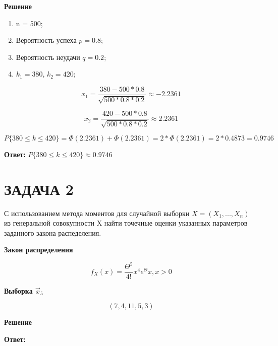 \documentclass[12pt, a4paper]{report}
\begin{document}
	
	\vspace{0.2cm}
	\textbf{Решение}
	
	\begin{enumerate}
		\item n = 500;
		\item Вероятность успеха $p = 0.8$;
		\item Вероятность неудачи $q = 0.2$;
		\item $k_1 = 380$, $k_2 = 420$;
	\end{enumerate}
	
	\vspace{0.5cm}
	
	\begin{equation*}
	x_1 = \frac{380 - 500 * 0.8}{\sqrt{500 * 0.8 * 0.2}} \approx -2.2361
	\end{equation*}
	
	\vspace{0.2cm}
	\begin{equation*}
	x_2 = \frac{420 - 500 * 0.8}{\sqrt{500 * 0.8 * 0.2}} \approx 2.2361
	\end{equation*}
	
	\vspace{0.7cm}
	
	\begin{equation*}
	P\{ 380 \le k \le 420 \} = \Phi(2.2361) + \Phi(2.2361) = 2*\Phi(2.2361) =  2 * 0.4873 = 0.9746
	\end{equation*}
	
	\vspace{0.5cm}
	\textbf{Ответ:}
	$P\{ 380 \le k \le 420 \} \approx 0.9746$
	
	
	
	
	
	
	\newpage
	
	\section{ЗАДАЧА 2}
	
	\hspace{1cm}
	С использованием метода моментов для случайной выборки $X = (X_1, ..., X_n)$ из генеральной совокупности X найти точечные оценки указанных параметров заданного закона распеделения.
	
	\vspace{0.5cm}
	\textbf{Закон распределения}
	
	\begin{equation*}
	f_X(x) = \frac{\Theta^5}{4!}  x^4  e^\Theta x, x > 0
	\end{equation*}
	
	\textbf{Выборка $\vec x_5$}
	
	\begin{equation*}
	(7, 4, 11, 5, 3)
	\end{equation*}
	
	\vspace{0.2cm}
	\textbf{Решение}
	
	\vspace{0.5cm}
	\textbf{Ответ:}
	
\end{document}
